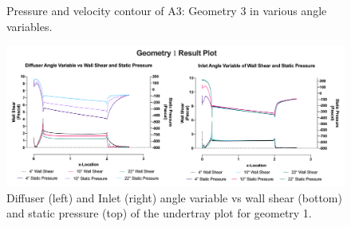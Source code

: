 \begin{figure}[]
    \noindent{}
    \caption{Pressure and velocity contour of A3: Geometry 3 in various angle variables.}
    \label{fig:2D_OF_A3_Contour2}
\end{figure}


\begin{figure}[]
    \centering
    \includegraphics[scale=0.8]{Figures/2D_OF/2D_OF_A1_PRESS_WShear_PLOT.png}
    \caption{Diffuser (left) and Inlet (right) angle variable vs wall shear (bottom) and static pressure (top) of the undertray plot for geometry 1.}
    \label{fig:2D_OF_A1_PLOT}
\end{figure}

